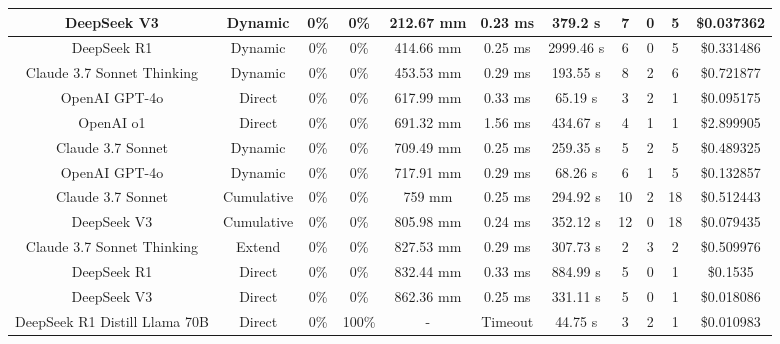 \begin{landscape}
\begin{table}[H]
\begin{center}
\begin{tabular}{|c|c|c|c|c|c|c|c|c|c|c|}
    \hline
    DeepSeek V3 & Dynamic & 0\% & 0\% & 212.67 mm & 0.23 ms & 379.2 s & 7 & 0 & 5 & \$0.037362 \\
    \hline
    DeepSeek R1 & Dynamic & 0\% & 0\% & 414.66 mm & 0.25 ms & 2999.46 s & 6 & 0 & 5 & \$0.331486 \\
    \hline
    Claude 3.7 Sonnet Thinking & Dynamic & 0\% & 0\% & 453.53 mm & 0.29 ms & 193.55 s & 8 & 2 & 6 & \$0.721877 \\
    \hline
    OpenAI GPT-4o & Direct & 0\% & 0\% & 617.99 mm & 0.33 ms & 65.19 s & 3 & 2 & 1 & \$0.095175 \\
    \hline
    OpenAI o1 & Direct & 0\% & 0\% & 691.32 mm & 1.56 ms & 434.67 s & 4 & 1 & 1 & \$2.899905 \\
    \hline
    Claude 3.7 Sonnet & Dynamic & 0\% & 0\% & 709.49 mm & 0.25 ms & 259.35 s & 5 & 2 & 5 & \$0.489325 \\
    \hline
    OpenAI GPT-4o & Dynamic & 0\% & 0\% & 717.91 mm & 0.29 ms & 68.26 s & 6 & 1 & 5 & \$0.132857 \\
    \hline
    Claude 3.7 Sonnet & Cumulative & 0\% & 0\% & 759 mm & 0.25 ms & 294.92 s & 10 & 2 & 18 & \$0.512443 \\
    \hline
    DeepSeek V3 & Cumulative & 0\% & 0\% & 805.98 mm & 0.24 ms & 352.12 s & 12 & 0 & 18 & \$0.079435 \\
    \hline
    Claude 3.7 Sonnet Thinking & Extend & 0\% & 0\% & 827.53 mm & 0.29 ms & 307.73 s & 2 & 3 & 2 & \$0.509976 \\
    \hline
    DeepSeek R1 & Direct & 0\% & 0\% & 832.44 mm & 0.33 ms & 884.99 s & 5 & 0 & 1 & \$0.1535 \\
    \hline
    DeepSeek V3 & Direct & 0\% & 0\% & 862.36 mm & 0.25 ms & 331.11 s & 5 & 0 & 1 & \$0.018086 \\
    \hline
    DeepSeek R1 Distill Llama 70B & Direct & 0\% & 100\% & - & Timeout & 44.75 s & 3 & 2 & 1 & \$0.010983 \\
    \hline
\end{tabular}
\label{Results-Position-1-5}
\end{center}
\end{table}


\end{landscape}
